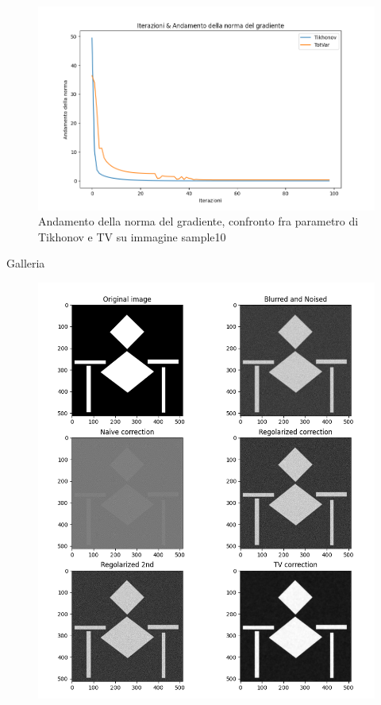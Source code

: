 \documentclass[12pt]{article}
\begin{document}
%
\makeatletter
\setlength{\@fptop}{0pt}
\makeatother
%
    \begin{figure}[t!]
    \centering
    \includegraphics[width=12cm]{norma-sample10}
    \caption{Andamento della norma del gradiente, confronto fra parametro di Tikhonov e TV su immagine sample10}
    \label{graph:6}
    \end{figure}

    \clearpage
    \listoffigures
    \newpage
    \listoftables

\cleardoublepage
    \centering
    \huge
    Galleria
\cleardoublepage

    \begin{figure}[h!]
    \centering
    \includegraphics[width=14cm]{sample1}
    \end{figure}
    \newpage
\end{document}

